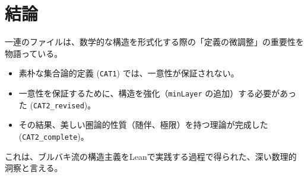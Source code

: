 \documentclass[a4paper,11pt]{ltjsarticle}
\theoremstyle{definition}
\begin{document}
\section{結論}

一連のファイルは、数学的な構造を形式化する際の「定義の微調整」の重要性を物語っている。
\begin{itemize}
    \item 素朴な集合論的定義 (\texttt{CAT1}) では、一意性が保証されない。
    \item 一意性を保証するために、構造を強化（\texttt{minLayer} の追加）する必要があった (\texttt{CAT2\_revised})。
    \item その結果、美しい圏論的性質（随伴、極限）を持つ理論が完成した (\texttt{CAT2\_complete})。
\end{itemize}
これは、ブルバキ流の構造主義をLeanで実践する過程で得られた、深い数理的洞察と言える。
\end{document}
